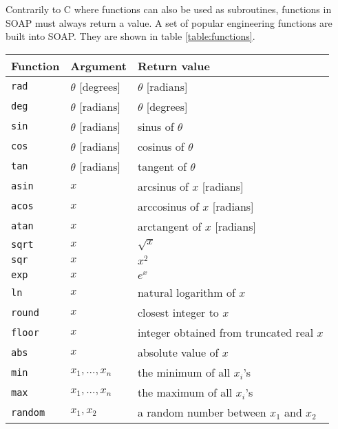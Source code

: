 \documentclass{warpdoc}
\renewcommand{\fontsizetable}{\footnotesize\scalefont{1.0}}
\begin{document}
Contrarily to C where functions
can also be used as subroutines, functions in SOAP must always return a value.
A set of popular engineering functions are built into SOAP. They
are shown in table \ref{table:functions}.
%
\begin{table}[ht]
\fontsizetable
\vspace{0.3cm}
\begin{center}
  \begin{threeparttable}
    \begin{tabular}{ll p{6.5cm}}
      \toprule
        Function & Argument               & Return value\\
      \midrule
        \verb|rad|   & $\theta$ [degrees] & $\theta$ [radians]\\
        \verb|deg|   & $\theta$ [radians] & $\theta$ [degrees]\\
        \verb|sin|   & $\theta$ [radians] & sinus of $\theta$\\
        \verb|cos|   & $\theta$ [radians] & cosinus of $\theta$\\
        \verb|tan|   & $\theta$ [radians] & tangent of $\theta$\\
        \verb|asin|  & $x$                & arcsinus of $x$ [radians]\\
        \verb|acos|  & $x$                & arccosinus of $x$ [radians]\\
        \verb|atan|  & $x$                & arctangent of $x$ [radians]\\
        \verb|sqrt|  & $x$                & $\sqrt{x}$ \\
        \verb|sqr|   & $x$                & $x^2$\\
        \verb|exp|   & $x$                & $e^x$ \\
        \verb|ln|    & $x$                & natural logarithm of $x$ \\
        \verb|round| & $x$                & closest integer to $x$ \\
        \verb|floor| & $x$                & integer obtained from truncated real $x$ \\
        \verb|abs|   & $x$                & absolute value of $x$ \\
        \verb|min|   & $x_1,...,x_n$      & the minimum of all $x_i$'s \\
        \verb|max|   & $x_1,...,x_n$      & the maximum of all $x_i$'s \\
        \verb|random|& $x_1,x_2$          & a random number between $x_1$ and $x_2$ \\

\end{tabular}
\end{threeparttable}
\end{center}
\end{table}
\end{document}
